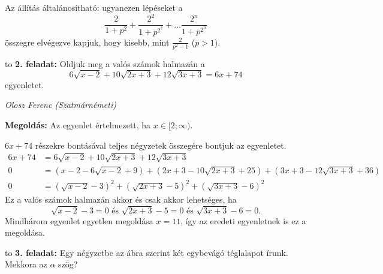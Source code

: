 \documentclass[a4paper,10pt]{article}
\newcommand{\ki}[2]{\hfill {\it #1 (#2)}\medskip}
\newcommand{\vonal}{\hbox to \hsize{\hskip2truecm\hrulefill\hskip2truecm}}
\begin{document}
Az állítás általánosítható: ugyanezen lépéseket a 
\[\frac{2}{1+p^2}+\frac{2^2}{1+p^{2^2}}+\ldots\frac{2^n}{1+p^{2^n}}\]
összegre elvégezve kapjuk, hogy kisebb, mint $\frac{2}{p^2-1}$ ($p>1$).
\medskip

\vonal
{\bf 2. feladat: } Oldjuk meg a valós számok halmazán a
\[6\sqrt{x-2}+10\sqrt{2x+3}+12\sqrt{3x+3}=6x+74\]
egyenletet.

\ki{Olosz Ferenc}{Szatmárnémeti}\medskip

{\bf Megoldás: } Az egyenlet értelmezett, ha $x\in[2;\infty)$.

$6x+74$ részekre bontásával teljes négyzetek összegére bontjuk az egyenletet.
\begin{align*}
6x+74&=6\sqrt{x-2}+10\sqrt{2x+3}+12\sqrt{3x+3}\\
0&=\left(x-2-6\sqrt{x-2}+9\right)+\left(2x+3-10\sqrt{2x+3}+25\right)+\left(3x+3-12\sqrt{3x+3}+36\right)\\
0&=\left(\sqrt{x-2}-3\right)^2+\left(\sqrt{2x+3}-5\right)^2+\left(\sqrt{3x+3}-6\right)^2
\end{align*}
Ez a valós számok halmazán akkor és csak akkor lehetséges, ha
\[\sqrt{x-2}-3=0\text{ és }\sqrt{2x+3}-5=0\text{ és }\sqrt{3x+3}-6=0.\]
Mindhárom egyenlet egyetlen megoldása $x=11$, így az eredeti egyenletnek is ez a megoldása.

\medskip

\vonal
{\bf 3. feladat: } Egy négyzetbe az ábra szerint két egybevágó téglalapot írunk. Mekkora az $\alpha$ szög?
\begin{figure}[hpb]
\begin{center}
\end{center}
\end{figure}
\end{document}
